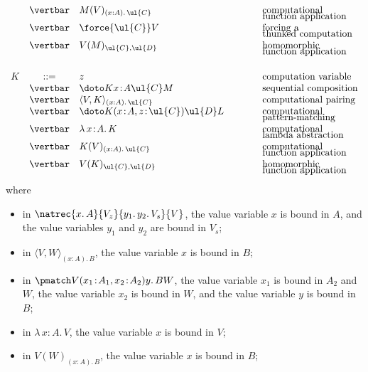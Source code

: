 \begin{definition}
\[
\begin{array}{r c l @{\qquad\qquad}l}
& \vertbar & M(V)_{(x : A).\,\ul{C}}  & \text{computational}
\\[-2mm]
& & & \text{function application}
\\
& \vertbar & \force {\ul{C}} V & \text{forcing a}
\\[-2mm]
& & & \text{thunked computation}
\\
& \vertbar & V(M)_{\ul{C}, \ul{D}} & \text{homomorphic}
\\[-2mm]
& & & \text{function application}
\\[5mm]
\index{term!homomorphism --}
K & ::= & z & \text{computation variable}
\\
& \vertbar & \doto K {x \!:\! A} {\ul{C}} M & \text{sequential composition}
\\
& \vertbar & \langle V , K \rangle_{(x : A).\, \ul{C}} & \text{computational pairing}
\\
& \vertbar & \doto K {(x \!:\! A, z \!:\! \ul{C})} {\ul{D}} L & \text{computational}
\\[-2mm]
&&& \text{pattern-matching}
\\
& \vertbar & \lambda \, x \!:\! A .\, K & \text{computational}
\\[-2mm]
&&& \text{lambda abstraction}
\\
& \vertbar & K(V)_{(x : A).\, \ul{C}}  & \text{computational}
\\[-2mm]
&&& \text{function application}
\\
& \vertbar & V(K)_{\ul{C}, \ul{D}} & \text{homomorphic}
\\[-2mm]
&&& \text{function application}
\end{array}
\]
where
\begin{itemize}
\item in $\natrec {x.\,A} {V_z} {y_1.\, y_2.\, V_s} {V}$, the value variable $x$ is bound in $A$, and the value variables $y_1$ and $y_2$ are bound in $V_s$;
\item in $\langle V , W \rangle_{(x : A).\, B}$, the value variable $x$ is bound in $B$;
\item in $\pmatch V {(x_1 \!:\! A_1, x_2 \!:\! A_2)} {y.\, B} W$, the value variable $x_1$ is bound in $A_2$ and $W$, the value variable $x_2$ is bound in $W$, and the value variable $y$ is bound in $B$;
\item in $\lambda \, x \!:\! A .\, V$, the value variable $x$ is bound in $V$;
\item in $V(W)_{(x : A).\,B}$, the value variable $x$ is bound in $B$;

\end{itemize}
\end{definition}
